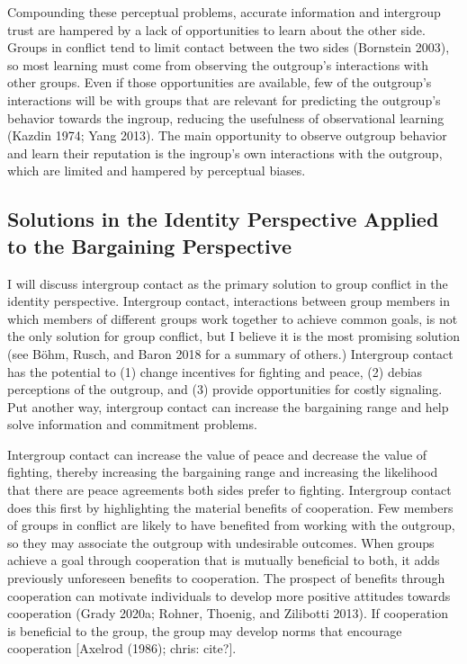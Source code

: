 \documentclass[11pt]{article}
\begin{document}
Compounding these perceptual problems, accurate information and
intergroup trust are hampered by a lack of opportunities to learn about
the other side. Groups in conflict tend to limit contact between the two
sides (Bornstein 2003), so most learning must come from observing the
outgroup's interactions with other groups. Even if those opportunities
are available, few of the outgroup's interactions will be with groups
that are relevant for predicting the outgroup's behavior towards the
ingroup, reducing the usefulness of observational learning (Kazdin 1974;
Yang 2013). The main opportunity to observe outgroup behavior and learn
their reputation is the ingroup's own interactions with the outgroup,
which are limited and hampered by perceptual biases.

\hypertarget{solutions-in-the-identity-perspective-applied-to-the-bargaining-perspective}{%
\subsection{Solutions in the Identity Perspective Applied to the
Bargaining
Perspective}\label{solutions-in-the-identity-perspective-applied-to-the-bargaining-perspective}}

I will discuss intergroup contact as the primary solution to group
conflict in the identity perspective. Intergroup contact, interactions
between group members in which members of different groups work together
to achieve common goals, is not the only solution for group conflict,
but I believe it is the most promising solution (see Böhm, Rusch, and
Baron 2018 for a summary of others.) Intergroup contact has the
potential to (1) change incentives for fighting and peace, (2) debias
perceptions of the outgroup, and (3) provide opportunities for costly
signaling. Put another way, intergroup contact can increase the
bargaining range and help solve information and commitment problems.

Intergroup contact can increase the value of peace and decrease the
value of fighting, thereby increasing the bargaining range and
increasing the likelihood that there are peace agreements both sides
prefer to fighting. Intergroup contact does this first by highlighting
the material benefits of cooperation. Few members of groups in conflict
are likely to have benefited from working with the outgroup, so they may
associate the outgroup with undesirable outcomes. When groups achieve a
goal through cooperation that is mutually beneficial to both, it adds
previously unforeseen benefits to cooperation. The prospect of benefits
through cooperation can motivate individuals to develop more positive
attitudes towards cooperation (Grady 2020a; Rohner, Thoenig, and
Zilibotti 2013). If cooperation is beneficial to the group, the group
may develop norms that encourage cooperation {[}Axelrod (1986); chris:
cite?{]}.
\end{document}
